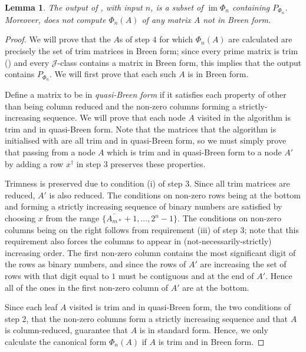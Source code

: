 \documentclass[11pt]{article}
\newtheorem{lemma}[thm]{Lemma}
\numberwithin{equation}{section}
\DeclareMathOperator{\im}{im}
\newcommand{\J}{\mathscr{J}}
\begin{document}
\begin{lemma}
  The output of , with input $n$, is a subset of
  $\im\Phi_n$ containing $P_{\Phi_n}$. Moreover, 
  does not compute $\Phi_n(A)$ of any matrix $A$ not in Breen form.
\end{lemma} 
\begin{proof}
  We will prove that the $A$s of step $4$ for which $\Phi_n(A)$ are calculated
  are precisely the set of trim matrices in Breen form; since every prime
  matrix is trim () and every $\J$-class
  contains a matrix in Breen form, this implies that the output contains
  $P_{\Phi_n}$. We will first prove that each such $A$ is in Breen form.

  Define a matrix to be in \emph{quasi-Breen form} if it satisfies each
  property of  other than being column reduced and the
  non-zero columns forming a strictly-increasing sequence.
  We will prove that each node $A$ visited in the algorithm is trim and in
  quasi-Breen form. Note that the matrices that the algorithm is initialised
  with are all trim and in quasi-Breen form, so we must simply prove that
  passing from a node $A$ which is trim and in quasi-Breen form to a node
  $A'$ by adding a row $x^{\dagger}$ in step $3$ preserves these properties.

  Trimness is preserved due to condition (i) of step $3$. Since all trim
  matrices are reduced, $A'$ is also reduced. The conditions on non-zero rows
  being at the bottom and forming a strictly increasing sequence of binary
  numbers are satisfied by choosing $x$ from the range $\{\bar{A_{m*}} + 1,
    \ldots, 2^n - 1\}$.  The conditions on non-zero columns being on the right
  follows from requirement (iii) of step $3$; note that this requirement also
  forces the columns to appear in (not-necessarily-strictly) increasing order.
  The first non-zero column contains the most significant digit of the rows as
  binary numbers, and since the rows of $A'$ are increasing the set of rows with
  that digit equal to $1$ must be contiguous and at the end of $A'$. Hence all
  of the ones in the first non-zero column of $A'$ are at the bottom.

  Since each leaf $A$ visited is trim and in quasi-Breen form, the two
  conditions of step 2, that the non-zero columns form a strictly increasing
  sequence and that $A$ is column-reduced, guarantee that $A$ is in standard
  form. Hence, we only calculate the canonical form $\Phi_n(A)$ if $A$ is trim
  and in Breen form.


\end{proof}
\end{document}
